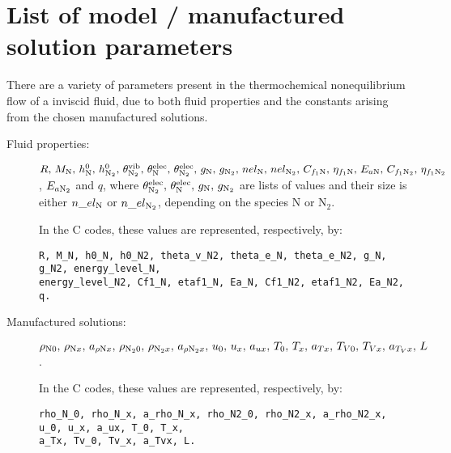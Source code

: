 \section{List of model / manufactured solution parameters}

There are a variety of parameters present in the thermochemical nonequilibrium flow of a inviscid fluid, due to both fluid properties and the constants arising from the chosen manufactured solutions.

\begin{description}
\item[Fluid properties:] $R , \, M_{\text{N}} , \,  h^0_{\text{N}} , \, h^0_{\text{N}_2} , \, \theta^{\text{vib}}_{\text{N}_2} , \, \theta^{\text{elec}}_{\text{N}} , \,  \theta^{\text{elec}}_{\text{N}_2} , \,   g_{\text{N}} , \,  g_{\text{N}_2} , \,  nel_{\text{N}} , \, nel_{\text{N}_2} , \,  C_{f_1 \text{N}} , \,  \eta_{f_1 \text{N}}  , \, E_{a\text{N}} , \,  C_{f_1 \text{N}_2} , \,  \eta_{f_1 \text{N}_2} $,  $E_{a\text{N}_2}$ and $ q$,  
where $ \theta^{\text{elec}}_{\text{N}_2} , \,  \theta^{\text{elec}}_{\text{N}} , \,  g_{\text{N}} , \,  g_{\text{N}_2}$ are lists of values and their size is either $n\_el_{\text{N}}$ or $n\_el_{\text{N}_2}$,  depending on the species N or N$_2$.

\vspace{10pt}
In the C codes, these values are represented, respectively, by:
\vspace{-5pt}
\begin{verbatim}
R, M_N, h0_N, h0_N2, theta_v_N2, theta_e_N, theta_e_N2, g_N, g_N2, energy_level_N, 
energy_level_N2, Cf1_N, etaf1_N, Ea_N, Cf1_N2, etaf1_N2, Ea_N2, q.

\end{verbatim}


\item[Manufactured solutions:] $\rho_{\text{N} 0} , \,  \rho_{\text{N} x} , \,  a_{  \rho \text{N} x } , \,  \rho_{\text{N}_2 0} , \, \rho_{\text{N}_2 x} , \,  a_{ \rho \text{N}_2 x } , \,  u_{0} , \, u_{x}  , \, a_{u x}  , \, 
 T_{0} , \, T_{x} , \,  a_{T x} , \,  T_{V0} , \, T_{Vx}  , \,  a_{T_V x} , \, L $.

\vspace{10pt}
In the C codes, these values are represented, respectively, by:
\vspace{-5pt}
\begin{verbatim} 
rho_N_0, rho_N_x, a_rho_N_x, rho_N2_0, rho_N2_x, a_rho_N2_x, u_0, u_x, a_ux, T_0, T_x,
a_Tx, Tv_0, Tv_x, a_Tvx, L.
\end{verbatim}
\end{description}


